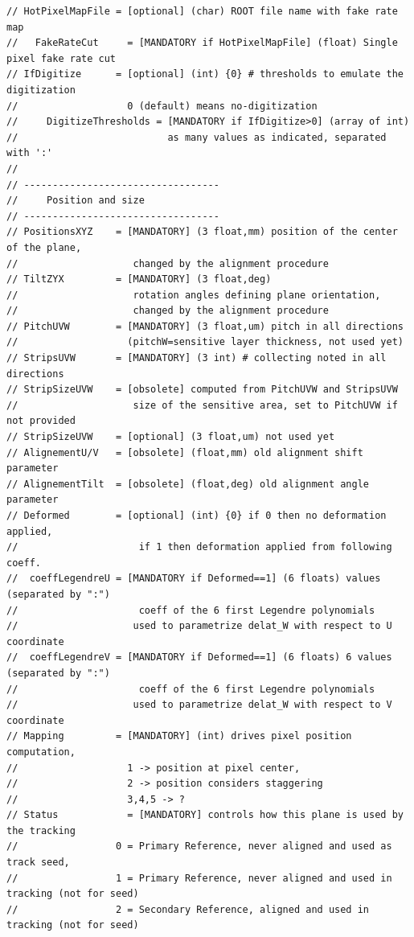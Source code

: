 \documentclass[a4paper, 12pt, twoside]{article}
\begin{document}
\begin{verbatim}
// HotPixelMapFile = [optional] (char) ROOT file name with fake rate map
//   FakeRateCut     = [MANDATORY if HotPixelMapFile] (float) Single pixel fake rate cut
// IfDigitize      = [optional] (int) {0} # thresholds to emulate the digitization
//                   0 (default) means no-digitization
//     DigitizeThresholds = [MANDATORY if IfDigitize>0] (array of int)
//                          as many values as indicated, separated with ':'
//
// ----------------------------------
//     Position and size
// ----------------------------------
// PositionsXYZ    = [MANDATORY] (3 float,mm) position of the center of the plane, 
//                    changed by the alignment procedure
// TiltZYX         = [MANDATORY] (3 float,deg) 
//                    rotation angles defining plane orientation, 
//                    changed by the alignment procedure
// PitchUVW        = [MANDATORY] (3 float,um) pitch in all directions 
//                   (pitchW=sensitive layer thickness, not used yet)
// StripsUVW       = [MANDATORY] (3 int) # collecting noted in all directions
// StripSizeUVW    = [obsolete] computed from PitchUVW and StripsUVW
//                    size of the sensitive area, set to PitchUVW if not provided
// StripSizeUVW    = [optional] (3 float,um) not used yet
// AlignementU/V   = [obsolete] (float,mm) old alignment shift parameter
// AlignementTilt  = [obsolete] (float,deg) old alignment angle parameter
// Deformed        = [optional] (int) {0} if 0 then no deformation applied, 
//                     if 1 then deformation applied from following coeff.
//  coeffLegendreU = [MANDATORY if Deformed==1] (6 floats) values (separated by ":")
//                     coeff of the 6 first Legendre polynomials
//                    used to parametrize delat_W with respect to U coordinate
//  coeffLegendreV = [MANDATORY if Deformed==1] (6 floats) 6 values (separated by ":")
//                     coeff of the 6 first Legendre polynomials
//                    used to parametrize delat_W with respect to V coordinate
// Mapping         = [MANDATORY] (int) drives pixel position computation, 
//                   1 -> position at pixel center,
//                   2 -> position considers staggering
//                   3,4,5 -> ?
// Status            = [MANDATORY] controls how this plane is used by the tracking
//                 0 = Primary Reference, never aligned and used as track seed,
//                 1 = Primary Reference, never aligned and used in tracking (not for seed)
//                 2 = Secondary Reference, aligned and used in tracking (not for seed)

\end{verbatim}
\end{document}
